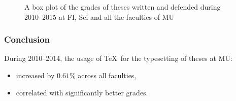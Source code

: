 \documentclass[11pt,twoside]{article}
\let\oldframetitle\frametitle
\def\frametitle#1{\oldframetitle{#1}\noindent}
\begin{document}
\begin{frame}
\begin{figure}
{
    \ifbeamerarticle\else}\fi%
    \caption{A box plot of the grades of theses written and
      defended during 2010--2015 at FI, Sci and all the
      faculties of MU}
  \end{figure}
\end{frame}
\begin{frame}
  \frametitle{Conclusion}
  During 2010--2014, the usage of \TeX\ for the typesetting of
  theses at MU: \begin{itemize}
    \item increased by $0.61\%$ across all faculties,
    \item correlated with significantly better grades.
  \end{itemize}
\end{frame}
\FloatBarrier
\end{document}
